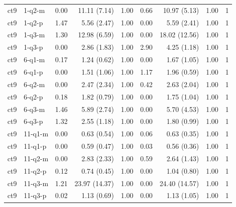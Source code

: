 \begin{tabular}{llrrrrrrr}
ct9 & 1-q2-m & 0.00 & 11.11 (7.14) & 1.00 & 0.66 & 10.97 (5.13) & 1.00 & 1\\
ct9 & 1-q2-p & 1.47 & 5.56 (2.47) & 1.00 & 0.00 & 5.59 (2.41) & 1.00 & 1\\
ct9 & 1-q3-m & 1.30 & 12.98 (6.59) & 1.00 & 0.00 & 18.02 (12.56) & 1.00 & 1\\
ct9 & 1-q3-p & 0.00 & 2.86 (1.83) & 1.00 & 2.90 & 4.25 (1.18) & 1.00 & 1\\
ct9 & 6-q1-m & 0.17 & 1.24 (0.62) & 1.00 & 0.00 & 1.67 (1.05) & 1.00 & 1\\
ct9 & 6-q1-p & 0.00 & 1.51 (1.06) & 1.00 & 1.17 & 1.96 (0.59) & 1.00 & 1\\
ct9 & 6-q2-m & 0.00 & 2.47 (2.34) & 1.00 & 0.42 & 2.63 (2.04) & 1.00 & 1\\
ct9 & 6-q2-p & 0.18 & 1.82 (0.79) & 1.00 & 0.00 & 1.75 (1.04) & 1.00 & 1\\
ct9 & 6-q3-m & 1.46 & 5.89 (2.74) & 1.00 & 0.00 & 5.70 (4.53) & 1.00 & 1\\
ct9 & 6-q3-p & 1.32 & 2.55 (1.18) & 1.00 & 0.00 & 1.80 (0.99) & 1.00 & 1\\
ct9 & 11-q1-m & 0.00 & 0.63 (0.54) & 1.00 & 0.06 & 0.63 (0.35) & 1.00 & 1\\
ct9 & 11-q1-p & 0.00 & 0.59 (0.47) & 1.00 & 0.03 & 0.56 (0.36) & 1.00 & 1\\
ct9 & 11-q2-m & 0.00 & 2.83 (2.33) & 1.00 & 0.59 & 2.64 (1.43) & 1.00 & 1\\
ct9 & 11-q2-p & 0.12 & 0.74 (0.45) & 1.00 & 0.00 & 1.04 (0.80) & 1.00 & 1\\
ct9 & 11-q3-m & 1.21 & 23.97 (14.37) & 1.00 & 0.00 & 24.40 (14.57) & 1.00 & 1\\
ct9 & 11-q3-p & 0.02 & 1.13 (0.69) & 1.00 & 0.00 & 1.13 (1.05) & 1.00 & 1\\
\hline
\end{tabular}
